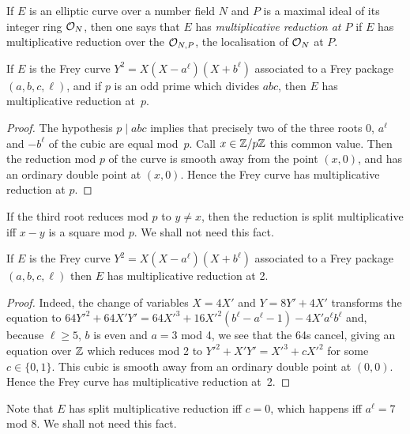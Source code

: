  If $E$ is an elliptic curve 
  over a number field $N$ and $P$ is a maximal ideal of its integer ring $\mathcal{O}_N$, then one says that $E$ has \emph{multiplicative reduction at $P$} if $E$ has multiplicative reduction over the $\mathcal{O}_{N,P}$, the localisation of $\mathcal{O}_N$ at $P$.

\begin{lemma}\label{Frey_curve_mult_reduction} If $E$ is the Frey curve $Y^2=X(X-a^\ell)(X+b^\ell)$ associated to a Frey
  package $(a,b,c,\ell)$, and if $p$ is an odd prime
  which divides $abc$, then $E$ has multiplicative reduction at~$p$.
\end{lemma}
\begin{proof} The hypothesis $p\mid abc$ implies that precisely two of the three roots $0$, $a^\ell$ and $-b^\ell$
  of the cubic are equal mod~$p$. Call $x\in\mathbb{Z}/p\mathbb{Z}$ this common value. Then the reduction mod $p$ of 
  the curve is smooth away from the point $(x,0)$,
  and has an ordinary double point at $(x,0)$. Hence the Frey curve has
  multiplicative reduction at $p$.
\end{proof}
\begin{remark} If the third root reduces mod $p$ to $y\not=x$, then the reduction
  is split multiplicative iff $x-y$ is a square mod $p$. We shall not need this fact.
\end{remark}

\begin{lemma}\label{Frey_curve_mult_reduction_at_two}  If $E$ is the Frey curve $Y^2=X(X-a^\ell)(X+b^\ell)$ associated to a Frey package
  $(a,b,c,\ell)$ then $E$ has multiplicative reduction at 2. 
\end{lemma}
\begin{proof} Indeed, the change of variables $X=4X'$ 
  and $Y=8Y'+4X'$ transforms the equation to 
  $64Y'^2+64X'Y'=64X'^3+16X'^2(b^\ell-a^\ell-1)-4X'a^\ell b^\ell$ and, because $\ell\geq5$,
  $b$ is even and $a=3$ mod 4, we see that the 64s cancel, giving an equation over $\mathbb{Z}$ which reduces mod 2 to
  $Y'^2+X'Y'=X'^3+cX'^2$ for some $c\in\{0,1\}$. This cubic is smooth away from an ordinary 
  double point at $(0,0)$. Hence the Frey curve has multiplicative reduction at~2.
\end{proof}
\begin{remark} Note that $E$ has split multiplicative reduction iff $c=0$, which happens iff $a^\ell=7$ mod $8$. We shall not need this fact.
\end{remark}

